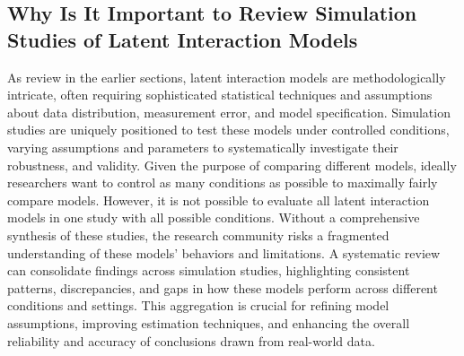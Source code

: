 \documentclass[
  man]{apa6}
\begin{document}
\hypertarget{why-is-it-important-to-review-simulation-studies-of-latent-interaction-models}{%
\subsection{Why Is It Important to Review Simulation Studies of Latent Interaction Models}\label{why-is-it-important-to-review-simulation-studies-of-latent-interaction-models}}

As review in the earlier sections, latent interaction models are methodologically intricate, often requiring sophisticated statistical techniques and assumptions about data distribution, measurement error, and model specification. Simulation studies are uniquely positioned to test these models under controlled conditions, varying assumptions and parameters to systematically investigate their robustness, and validity. Given the purpose of comparing different models, ideally researchers want to control as many conditions as possible to maximally fairly compare models. However, it is not possible to evaluate all latent interaction models in one study with all possible conditions. Without a comprehensive synthesis of these studies, the research community risks a fragmented understanding of these models' behaviors and limitations. A systematic review can consolidate findings across simulation studies, highlighting consistent patterns, discrepancies, and gaps in how these models perform across different conditions and settings. This aggregation is crucial for refining model assumptions, improving estimation techniques, and enhancing the overall reliability and accuracy of conclusions drawn from real-world data.
\end{document}
